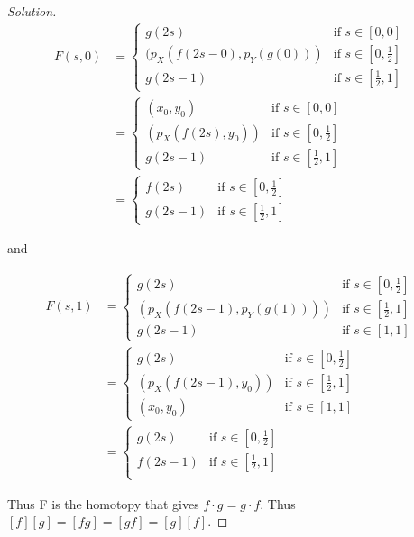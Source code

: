 \documentclass{article}
\newenvironment{solution}
{\renewcommand\qedsymbol{$\blacksquare$}\begin{proof}[Solution]}
{\end{proof}}
\begin{document}
\begin{solution}
    \begin{align*}
        F(s, 0) &= 
        \begin{cases*}
            g(2s) & \text{if $s \in [0, 0]$ } \\
            (p_X(f(2s - 0), p_Y(g(0))) & \text{if $s \in [0, \frac{1}{2}]$ } \\ 
            g(2s - 1) & \text{if $s \in [\frac{1}{2}, 1]$ }
        \end{cases*} \\
        &= \begin{cases*}
            (x_0, y_0) & \text{if $s \in [0, 0]$ } \\
        (p_X(f(2s), y_0)) & \text{if $s \in [0, \frac{1}{2}]$ } \\ 
        g(2s - 1) & \text{if $s \in [\frac{1}{2}, 1]$ }
        \end{cases*} \\
        &= \begin{cases}
        f(2s) & \text{if $s \in [0, \frac{1}{2}]$ } \\ 
        g(2s - 1) & \text{if $s \in [\frac{1}{2}, 1]$ }
        \end{cases}
    \end{align*}

    and

    \begin{align*}
        F(s, 1) &= 
        \begin{cases*}
            g(2s) & \text{if $s \in [0, \frac{1}{2}]$ } \\
            (p_X(f(2s - 1), p_Y(g(1)))) & \text{if $s \in [\frac{1}{2}, 1]$ } \\ 
            g(2s - 1) & \text{if $s \in [1, 1]$ }
        \end{cases*} \\
        &= \begin{cases*}
            g(2s) & \text{if $s \in [0, \frac{1}{2}]$ } \\
        (p_X(f(2s - 1), y_0)) & \text{if $s \in [\frac{1}{2}, 1]$ } \\ 
        (x_0, y_0) & \text{if $s \in [1, 1]$ }
        \end{cases*} \\
        &= \begin{cases}
            g(2s) & \text{if $s \in [0, \frac{1}{2}]$ } \\
        f(2s - 1) & \text{if $s \in [\frac{1}{2}, 1]$ } \\ 
        \end{cases}
    \end{align*}

    Thus F is the homotopy that gives $f \cdot g = g \cdot f$. Thus $[f] [g] = [fg] = [gf] = [g] [f]$.   

\end{solution}
\end{document}
